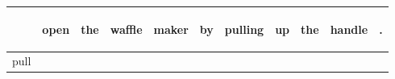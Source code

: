 \documentclass[landscape]{article}
\newcommand{\ssp}{\hspace{2pt}}
\begin{document}
\newpage

\noindent\begin{tabular}{|l|p{10pt}|p{10pt}|p{10pt}|p{10pt}|p{10pt}|p{10pt}|p{10pt}|p{10pt}|p{10pt}|p{10pt}|}
\hline
&\begin{sideways}\cellcolor{ref0}open\hspace{12pt}\end{sideways}&\begin{sideways}\cellcolor{ref1}the\hspace{12pt}\end{sideways}&\begin{sideways}\cellcolor{ref2}waffle\hspace{12pt}\end{sideways}&\begin{sideways}\cellcolor{ref3}maker\hspace{12pt}\end{sideways}&\begin{sideways}\cellcolor{ref4}by\hspace{12pt}\end{sideways}&\begin{sideways}\cellcolor{ref5}pulling\hspace{12pt}\end{sideways}&\begin{sideways}\cellcolor{ref6}up\hspace{12pt}\end{sideways}&\begin{sideways}\cellcolor{ref7}the\hspace{12pt}\end{sideways}&\begin{sideways}\cellcolor{ref8}handle\hspace{12pt}\end{sideways}&\begin{sideways}\cellcolor{ref9}.\hspace{12pt}\end{sideways}\\
\hline
\ssp pull \ssp&\hspace{2pt}&\hspace{2pt}&\hspace{2pt}&\hspace{2pt}&\hspace{2pt}&\hspace{2pt}&\hspace{2pt}&\hspace{2pt}&\hspace{2pt}&\hspace{2pt}\\

\end{tabular}
\end{document}
